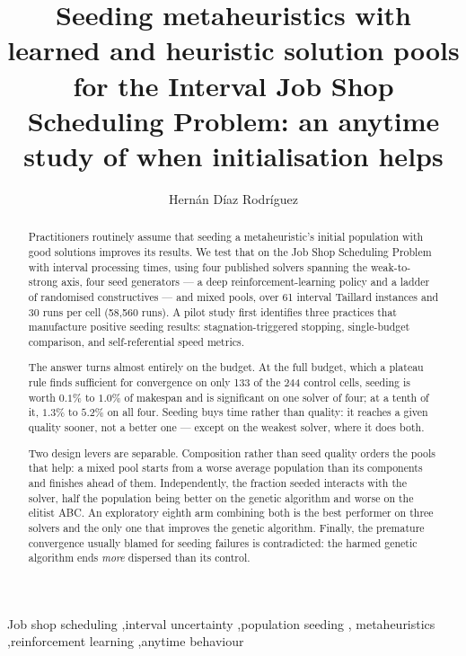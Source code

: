 \documentclass[review]{elsarticle}
\begin{document}
\begin{frontmatter}

\title{Seeding metaheuristics with learned and heuristic solution pools for
the Interval Job Shop Scheduling Problem: an anytime study of when
initialisation helps}

\author[uniovi]{Hern\'an D\'iaz Rodr\'iguez}


\begin{abstract}
Practitioners routinely assume that seeding a metaheuristic's initial
population with good solutions improves its results. We test that on the Job
Shop Scheduling Problem with interval processing times, using four published
solvers spanning the weak-to-strong axis, four seed generators --- a deep
reinforcement-learning policy and a ladder of randomised constructives ---
and mixed pools, over 61 interval Taillard instances and 30 runs per cell
(58{,}560 runs). A pilot study first identifies three practices that
manufacture positive seeding results: stagnation-triggered stopping,
single-budget comparison, and self-referential speed metrics.

The answer turns almost entirely on the budget. At the full budget, which a
plateau rule finds sufficient for convergence on only 133 of the 244 control
cells, seeding is worth $0.1\%$ to $1.0\%$ of makespan and is significant on
one solver of four; at a tenth of it, $1.3\%$ to $5.2\%$ on all four.
Seeding buys time rather than quality: it reaches a given quality sooner,
not a better one --- except on the weakest solver, where it does both.

Two design levers are separable. Composition rather than seed quality orders
the pools that help: a mixed pool starts from a worse average population
than its components and finishes ahead of them. Independently, the fraction
seeded interacts with the solver, half the population being better on the
genetic algorithm and worse on the elitist ABC. An exploratory eighth arm
combining both is the best performer on three solvers and the only one that
improves the genetic algorithm. Finally, the premature convergence usually
blamed for seeding failures is contradicted: the harmed genetic algorithm
ends \emph{more} dispersed than its control.
\end{abstract}

\begin{keyword}
Job shop scheduling \sep interval uncertainty \sep population seeding \sep
metaheuristics \sep reinforcement learning \sep anytime behaviour
\end{keyword}

\end{frontmatter}
\end{document}
